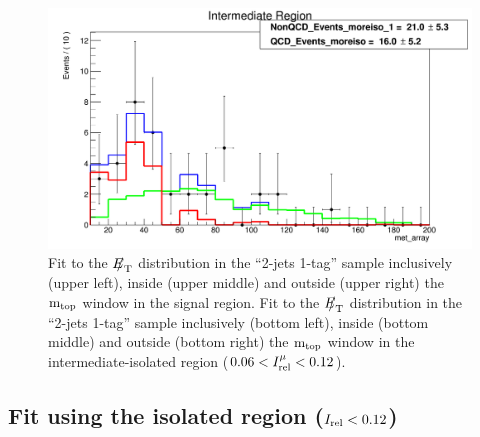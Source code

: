 {\begin{figure}[h!]
{\begin{centering}
\includegraphics[scale=0.2]{figures/2J1T/MET_fit_2j1t_moreiso_SB}
\par\end{centering}
}
\caption{Fit to the ${E\!\!\!/}_{\mathrm{T}}$ distribution in the \textquotedblleft{}2-jets
1-tag\textquotedblright{} sample inclusively (upper left), inside
(upper middle) and outside (upper right) the ${\rm m_{top}}$ window in
the signal region. Fit to the ${E\!\!\!/}_{\mathrm{T}}$ distribution in the
\textquotedblleft{}2-jets 1-tag\textquotedblright{} sample inclusively
(bottom left), inside (bottom middle) and outside (bottom right) the ${\rm m_{top}}$
window in the intermediate-isolated region ($0.06 < I_{\rm rel}^{\mu} < 0.12$). }
\end{figure}


\clearpage

\subsection{Fit using the isolated region ($I_{\mathrm{rel}} < 0.12$)}

}
